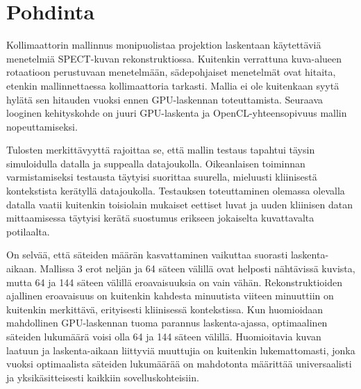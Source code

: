 \section{Pohdinta}
Kollimaattorin mallinnus monipuolistaa projektion laskentaan käytettäviä menetelmiä SPECT-kuvan rekonstruktiossa. Kuitenkin verrattuna kuva-alueen rotaatioon perustuvaan menetelmään, sädepohjaiset menetelmät ovat hitaita, etenkin mallinnettaessa kollimaattoria tarkasti. Mallia ei ole kuitenkaan syytä hylätä sen hitauden vuoksi ennen GPU-laskennan toteuttamista. Seuraava looginen kehityskohde on juuri GPU-laskenta ja OpenCL-yhteensopivuus mallin nopeuttamiseksi. 

Tulosten merkittävyyttä rajoittaa se, että mallin testaus tapahtui täysin simuloidulla datalla ja suppealla datajoukolla. Oikeanlaisen toiminnan varmistamiseksi testausta täytyisi suorittaa suurella, mieluusti kliinisestä kontekstista kerätyllä datajoukolla. Testauksen toteuttaminen olemassa olevalla datalla vaatii kuitenkin toisiolain mukaiset eettiset luvat ja uuden kliinisen datan mittaamisessa täytyisi kerätä suostumus erikseen jokaiselta kuvattavalta potilaalta.

On selvää, että säteiden määrän kasvattaminen vaikuttaa suorasti laskenta-aikaan. Mallissa 3 erot neljän ja 64 säteen välillä ovat helposti nähtävissä kuvista, mutta 64 ja 144 säteen välillä eroavaisuuksia on vain vähän. Rekonstruktioiden ajallinen eroavaisuus on kuitenkin kahdesta minuutista viiteen minuuttiin on kuitenkin merkittävä, erityisesti kliinisessä kontekstissa. Kun huomioidaan mahdollinen GPU-laskennan tuoma parannus laskenta-ajassa, optimaalinen säteiden lukumäärä voisi olla 64 ja 144 säteen välillä. Huomioitavia kuvan laatuun ja laskenta-aikaan liittyviä muuttujia on kuitenkin lukemattomasti, jonka vuoksi optimaalista säteiden lukumäärää on mahdotonta määrittää universaalisti ja yksikäsitteisesti kaikkiin sovelluskohteisiin.